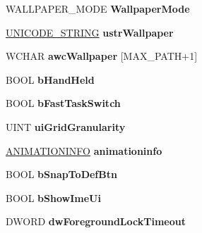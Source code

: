 \begin{DoxyCompactItemize}
\mbox{\label{struct___s_p_i_v_a_l_u_e_s_a08c861fb48695d8bdc85f9433df8abd1}} 
W\+A\+L\+L\+P\+A\+P\+E\+R\+\_\+\+M\+O\+DE {\bfseries Wallpaper\+Mode}
\item 
\mbox{\label{struct___s_p_i_v_a_l_u_e_s_a37158122db0f4965de50dbb7d7e88712}} 
\hyperlink{struct___u_n_i_c_o_d_e___s_t_r_i_n_g}{U\+N\+I\+C\+O\+D\+E\+\_\+\+S\+T\+R\+I\+NG} {\bfseries ustr\+Wallpaper}
\item 
\mbox{\label{struct___s_p_i_v_a_l_u_e_s_a920c18bdf5a3587cd68d852d616d5482}} 
W\+C\+H\+AR {\bfseries awc\+Wallpaper} \mbox{[}M\+A\+X\+\_\+\+P\+A\+TH+1\mbox{]}
\item 
\mbox{\label{struct___s_p_i_v_a_l_u_e_s_a2ab263bed858e907fe409d4023dec718}} 
B\+O\+OL {\bfseries b\+Hand\+Held}
\item 
\mbox{\label{struct___s_p_i_v_a_l_u_e_s_af5d23373d56fca4f5fbb21420fc92a06}} 
B\+O\+OL {\bfseries b\+Fast\+Task\+Switch}
\item 
\mbox{\label{struct___s_p_i_v_a_l_u_e_s_abbea908f4425e93f74bed8e98e445b5a}} 
U\+I\+NT {\bfseries ui\+Grid\+Granularity}
\item 
\mbox{\label{struct___s_p_i_v_a_l_u_e_s_a74f11bf29c5cbb483446ae320a4c18d0}} 
\hyperlink{structtag_a_n_i_m_a_t_i_o_n_i_n_f_o}{A\+N\+I\+M\+A\+T\+I\+O\+N\+I\+N\+FO} {\bfseries animationinfo}
\item 
\mbox{\label{struct___s_p_i_v_a_l_u_e_s_a58c491079340ff28e2e54f2ecbfb58c3}} 
B\+O\+OL {\bfseries b\+Snap\+To\+Def\+Btn}
\item 
\mbox{\label{struct___s_p_i_v_a_l_u_e_s_aff5c19d2a94d54fd05ce6f851b224848}} 
B\+O\+OL {\bfseries b\+Show\+Ime\+Ui}
\item 
\mbox{\label{struct___s_p_i_v_a_l_u_e_s_a43282084fbd9377cf139925ce7fb5be1}} 
D\+W\+O\+RD {\bfseries dw\+Foreground\+Lock\+Timeout}
\item 

\end{DoxyCompactItemize}
